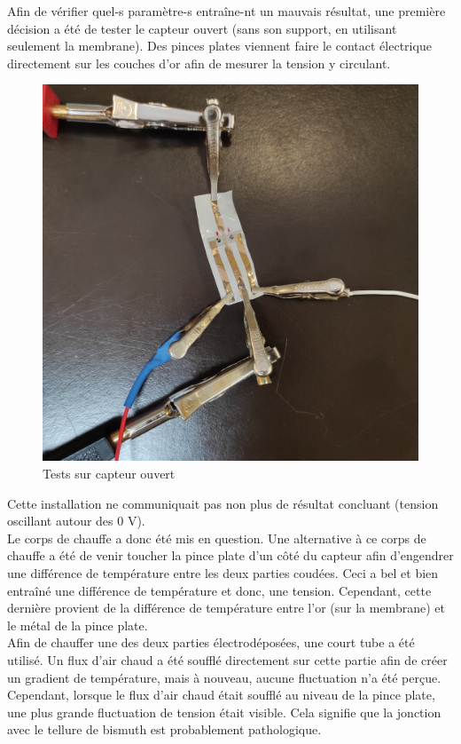 Afin de vérifier quel-s paramètre-s entraîne-nt un mauvais résultat, une première décision a été de tester le \gls{capteur} ouvert (sans son support,
en utilisant seulement la membrane).
Des pinces plates viennent faire le contact électrique directement sur les couches d'or afin de mesurer la tension y circulant.
\begin{figure}[H]
    \centering
    \includegraphics[scale = 0.05]{assets/figures/CapteurOuvert.jpg}
    \caption{Tests sur capteur ouvert}
    \label{fig:capteurOuvert}
\end{figure}
Cette installation ne communiquait pas non plus de résultat concluant (tension oscillant autour des 0 V). \\

Le corps de chauffe a donc été mis en question. Une alternative à ce corps de chauffe a été de venir toucher la pince plate d'un côté du
capteur afin d'engendrer une différence de température entre les deux parties coudées. Ceci a bel et bien entraîné une différence de
température et donc, une tension. Cependant, cette dernière provient de la différence de température entre l'or (sur la membrane) et le métal
de la pince plate. \\

Afin de chauffer une des deux parties électrodéposées, une court tube a été utilisé. Un flux d'air chaud a été soufflé directement sur cette
partie afin de créer un gradient de température, mais à nouveau, aucune fluctuation n'a été perçue. Cependant, lorsque le flux d'air chaud
était soufflé au niveau de la pince plate, une plus grande fluctuation de tension était visible. Cela signifie que la jonction avec le tellure
de bismuth est probablement pathologique.\\

